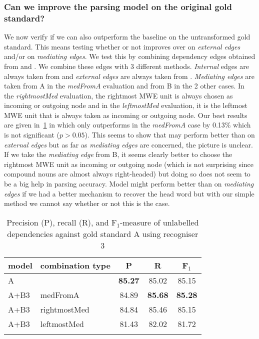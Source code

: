 \documentclass[output=paper]{langsci/langscibook}
\begin{document}
\subsubsection{Can we improve the parsing model on the original gold standard?}
\indent We now verify if we can also outperform the baseline on the untransformed gold standard. This means testing whether or not {\modelB} improves over {\modelA} on \textit{external edges} and/or on \textit{mediating edges}. We test this by combining dependency edges obtained from {\modelA} and {\modelB}. We combine these edges with 3 different methods. \textit{Internal} edges are always taken from {\modelA} and \textit{external edges} are always taken from {\modelB}. \textit{Mediating edges} are taken from A in the \textit{medFromA} evaluation and from B in the 2 other cases. In the \textit{rightmostMed} evaluation, the rightmost MWE unit is always chosen as incoming or outgoing node and in the \textit{leftmostMed} evaluation, it is the leftmost MWE unit that is always taken as incoming or outgoing node. Our best results are given in~\ref{del:tab:res2} in which {\modelB} only outperforms {\modelA} in the \textit{medFromA} case by 0.13\% which is not significant ($p>0.05$). This seems to show that {\modelB} may perform better than {\modelA} on \textit{external edges} but as far as \textit{mediating edges} are concerned, the picture is unclear. If we take the \textit{mediating edge} from B, it seems clearly better to choose the rightmost MWE unit as incoming or outgoing node (which is not surprising since compound nouns are almost always right-headed) but doing so does not seem to be a big help in parsing accuracy. Model might perform better than {\modelA} on \textit{mediating edges} if we had a better mechanism to recover the head word but with our simple method we cannot say whether or not this is the case.

\begin{table}[h]
    \centering
    \begin{tabular}{l l c c c} %
      \lsptoprule
        \textnormal{model}
        & \textnormal{combination type}
        & \textnormal{P}
        & \textnormal{R}
        & \textnormal{F$_1$}
        \\ %
        \midrule
        A & & \textbf{85.27} & 85.02 & 85.15\\
        A+B3 & medFromA &84.89  &\textbf{85.68} & \textbf{85.28} \\
        A+B3 & rightmostMed &84.84  &85.46  & 85.15 \\
        A+B3 & leftmostMed &81.43  &82.02  & 81.72 \tabularnewline %
        \lspbottomrule
    \end{tabular}
    \caption{Precision (P), recall (R), and F$_1$-measure of unlabelled dependencies against gold standard A using recogniser 3\label{del:tab:res2}}
\end{table}
\end{document}
